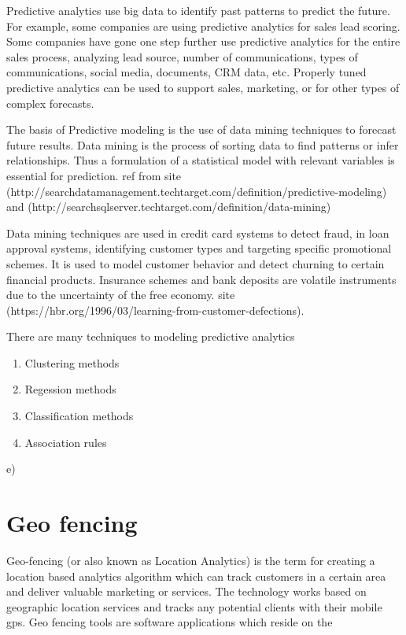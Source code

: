 Predictive analytics use big data to identify past patterns to predict the future. For example, some companies are using predictive analytics for sales lead scoring. Some companies have gone one step further use predictive analytics for the entire sales process, analyzing lead source, number of communications, types of communications, social media, documents, CRM data, etc. Properly tuned predictive analytics can be used to support sales, marketing, or for other types of complex forecasts.


The basis of Predictive modeling is the use of data mining techniques to forecast future results. Data mining is the process of sorting data to find patterns or infer relationships.
Thus a formulation of a statistical model with relevant variables is essential for prediction. 
ref from site (http://searchdatamanagement.techtarget.com/definition/predictive-modeling) and (http://searchsqlserver.techtarget.com/definition/data-mining)

Data mining techniques are used in credit card systems to detect fraud, in loan approval systems, identifying customer types and targeting specific promotional schemes. It is used to model customer behavior and detect churning to certain financial products. Insurance schemes and bank deposits are volatile instruments due to the uncertainty of the free economy. site (https://hbr.org/1996/03/learning-from-customer-defections).


There are many techniques to modeling predictive analytics 


\begin{enumerate}
	\item Clustering methods
	\item Regession methods
	\item Classification methods
	\item Association rules
\end{enumerate}e)

%
%
%
%
\section{Geo fencing}
Geo-fencing (or also known as Location Analytics) is the term for creating a location based analytics algorithm which can track customers in a certain area and deliver valuable marketing or services. The technology works based on geographic location services and tracks any potential clients with their mobile gps. 
Geo fencing tools are software applications which reside on the 

